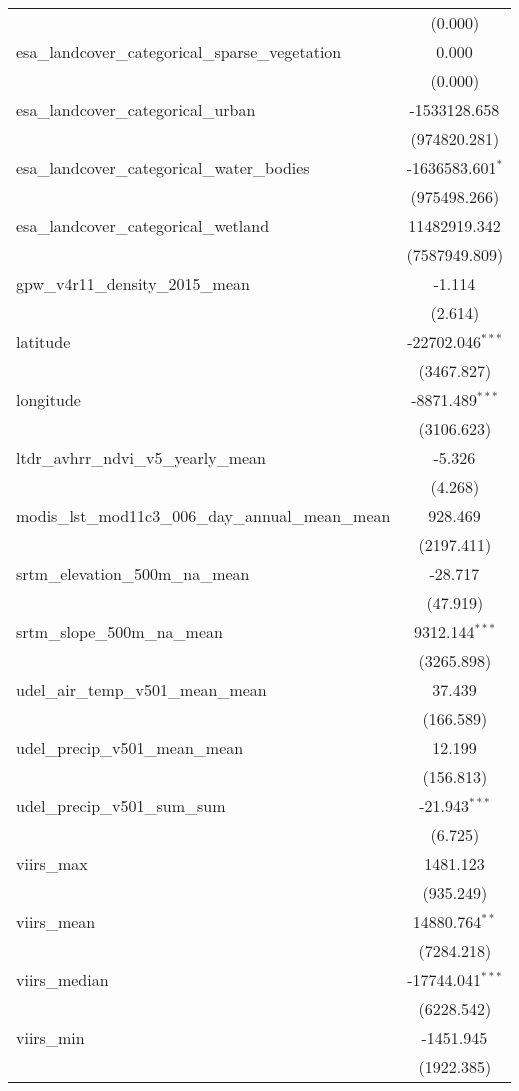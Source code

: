 \begin{table}[!htbp]
\begin{tabular}{@{\extracolsep{5pt}}lc}
  & (0.000) \\
 esa_landcover_categorical_sparse_vegetation & 0.000$^{}$ \\
  & (0.000) \\
 esa_landcover_categorical_urban & -1533128.658$^{}$ \\
  & (974820.281) \\
 esa_landcover_categorical_water_bodies & -1636583.601$^{*}$ \\
  & (975498.266) \\
 esa_landcover_categorical_wetland & 11482919.342$^{}$ \\
  & (7587949.809) \\
 gpw_v4r11_density_2015_mean & -1.114$^{}$ \\
  & (2.614) \\
 latitude & -22702.046$^{***}$ \\
  & (3467.827) \\
 longitude & -8871.489$^{***}$ \\
  & (3106.623) \\
 ltdr_avhrr_ndvi_v5_yearly_mean & -5.326$^{}$ \\
  & (4.268) \\
 modis_lst_mod11c3_006_day_annual_mean_mean & 928.469$^{}$ \\
  & (2197.411) \\
 srtm_elevation_500m_na_mean & -28.717$^{}$ \\
  & (47.919) \\
 srtm_slope_500m_na_mean & 9312.144$^{***}$ \\
  & (3265.898) \\
 udel_air_temp_v501_mean_mean & 37.439$^{}$ \\
  & (166.589) \\
 udel_precip_v501_mean_mean & 12.199$^{}$ \\
  & (156.813) \\
 udel_precip_v501_sum_sum & -21.943$^{***}$ \\
  & (6.725) \\
 viirs_max & 1481.123$^{}$ \\
  & (935.249) \\
 viirs_mean & 14880.764$^{**}$ \\
  & (7284.218) \\
 viirs_median & -17744.041$^{***}$ \\
  & (6228.542) \\
 viirs_min & -1451.945$^{}$ \\
  & (1922.385) \\

\end{tabular}
\end{table}
